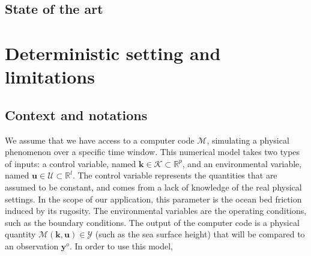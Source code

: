 \documentclass[npg]{copernicus}
\newcommand{\yobs}{\mathbf{y}^o}
\begin{document}
\subsection{State of the art}
\cite{kuczera_there_2010}

\section{Deterministic setting and limitations}
\subsection{Context and notations}
We assume that we have access to a computer code $\mathcal{M}$, simulating a physical phenomenon over a specific time window. This numerical model takes two types of inputs: a control variable, named $\mathbf{k} \in \mathcal{K}\subset \mathbb{R}^p$, and an environmental variable, named $\mathbf{u}\in\mathcal{U}\subset\mathbb{R}^l$. The control variable represents the quantities that are assumed to be constant, and comes from a lack of knowledge of the real physical settings. In the scope of our application, this parameter is the ocean bed friction induced by its rugosity. The environmental variables are the operating conditions, such as the boundary conditions. The output of the computer code is a physical quantity $\mathcal{M}(\mathbf{k},\mathbf{u})\in \mathcal{Y}$ (such as the sea surface height) that will be compared to an observation $\yobs$. In order to use this model, 
\end{document}
